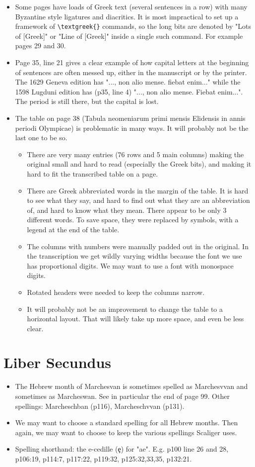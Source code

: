 \documentclass{report}
\begin{document}
\begin{itemize}
\item
Some pages have loads of Greek text (several sentences in a row) with many
Byzantine style ligatures and diacritics. It is most impractical to set up
a framework of \verb+\textgreek{}+ commands, so the long bits are denoted
by "Lots of [Greek]" or "Line of [Greek]" inside a single such command.
For example pages 29 and 30.
\item
Page 35, line 21 gives a clear example of how capital letters at the beginning
of sentences are often messed up, either in the manuscript or by the printer.
The 1629 Geneva edition has "..., non alio mense. fiebat enim..." while the
1598 Lugduni edition has (p35, line 4) "..., non alio mense. Fiebat enim...".
The period is still there, but the capital is lost.
\item
The table on page 38 (Tabula neomeniarum primi mensis Elidensis in annis
periodi Olympicae) is problematic in many ways. It will probably not be 
the last one to be so.
\begin{itemize}
  \item{}There are very many entries (76 rows and 5 main columns) making the
  original small and hard to read (especially the Greek bits), and making it
  hard to fit the transcribed table on a page.
  \item{}There are Greek abbreviated words in the margin of the table. It is
  hard to see what they say, and hard to find out what they are an abbreviation
  of, and hard to know what they mean. There appear to be only 3 different
  words. To save space, they were replaced by symbols, with a legend at the
  end of the table.
  \item{}The columns with numbers were manually padded out in the original.
  In the transcription we get wildly varying widths  because the font we use
  has proportional digits. We may want to use a font with monospace digits.
  \item{}Rotated headers were needed to keep the columns narrow.
  \item{}It will probably not be an improvement to change the table to a
  horizontal layout. That will likely take up more space, and even be
  less clear.
\end{itemize}
\end{itemize}

\section{Liber Secundus}
\begin{itemize}
\item
The Hebrew month of Marchesvan is sometimes spelled as Marchesvvan and
sometimes as Marcheswan. See in particular the end of page 99.
Other spellings: Marcheschban (p116), Marcheschvvan (p131).
\item
We may want to choose a standard spelling for all Hebrew months.
Then again, we may want to choose to keep the various spellings Scaliger uses.
\item
Spelling shorthand: the e-cedille (ȩ) for "ae".
E.g. p100 line 26 and 28, p106:19, p114:7, p117:22, p119:32,
p125:32,33,35, p132:21.
\end{itemize}
\end{document}

